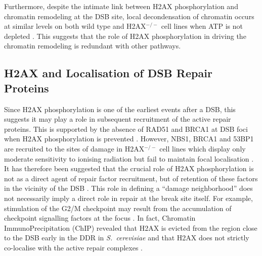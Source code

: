 \documentclass[graybox]{svmult}
\begin{document}
Furthermore, despite the intimate link between H2AX phosphorylation and chromatin remodeling at the
DSB site, local decondensation of chromatin occurs at similar levels on both wild type and H2AX$^{-/-}$ cell
lines when ATP is not depleted \cite{MJK+06}. This suggests that the role of H2AX phosphorylation in
driving the chromatin remodeling is redundant with other pathways.

\subsection{\ugamma H2AX and Localisation of DSB Repair Proteins}
\label{subsec:docking-site}
Since H2AX phosphorylation is one of the earliest events after a DSB, this suggests it may play a
role in subsequent recruitment of the active repair proteins. This is supported by the absence of
RAD51 and BRCA1 at DSB foci when \ugamma H2AX phosphorylation is prevented \cite{TTP+00}. However,
NBS1, BRCA1 and 53BP1 are recruited to the sites of damage in H2AX$^{-/-}$ cell lines which display
only moderate sensitivity to ionising radiation but fail to maintain focal localisation \cite{ACOF+03}.
It has therefore been suggested that the crucial role of H2AX phosphorylation is not as a direct agent
of repair factor recruitment, but of retention of these factors in the vicinity of the DSB \cite{ACOF+03}.
This role in defining a ``damage neighborhood'' does not necessarily imply a direct role in repair at
the break site itself. For example, stimulation of the G2/M checkpoint may result from the accumulation
of checkpoint signalling factors at the focus \cite{OFHC+02}. In fact, Chromatin ImmunoPrecipitation
(ChIP) revealed that \ugamma H2AX is evicted from the region close to the DSB early in the DDR in
\emph{S.\ cerevisiae} and that \ugamma H2AX does not strictly co-localise with the active repair
complexes \cite{RSAA+04}. 
\end{document}
